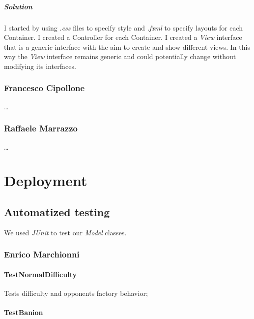 \documentclass[12pt, a4paper]{report}
\begin{document}
            \paragraph{Solution}

            I started by using \textit{.css} files to specify style and \textit{.fxml} to specify layouts for each Container.
            I created a Controller for each Container.
            I created a \textit{View} interface that is a generic interface with the aim to create and show different views.
            In this way the \textit{View} interface remains generic and could potentially change without modifying its interfaces.

    \subsection*{Francesco Cipollone}

    \dots

    \subsection*{Raffaele Marrazzo}

    \dots

\chapter{Deployment}

\section{Automatized testing}

    We used \emph{JUnit} to test our \emph{Model} classes.

    \subsection*{Enrico Marchionni}

    \subsubsection{TestNormalDifficulty}
    
    Tests difficulty and opponents factory behavior;

    \subsubsection{TestBanion}
    
\end{document}
